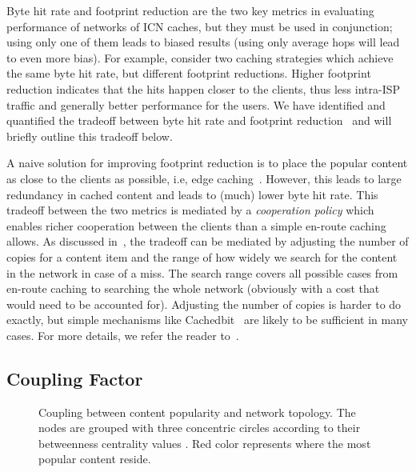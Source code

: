 \documentclass{sigcomm-alternate}
\begin{document}
Byte hit rate and footprint reduction are the two key metrics in evaluating performance of networks of ICN caches, but they must be used in conjunction; using only one of them leads to biased results (using only average hops will lead to even more bias).
For example, consider two caching strategies which achieve the same byte hit rate, but different footprint reductions.
Higher footprint reduction indicates that the hits happen closer to the clients, thus less intra-ISP traffic and generally better performance for the users.
We have identified and quantified the tradeoff between byte hit rate and footprint reduction~\cite{WangL:Cooperation} and will briefly outline this tradeoff below.

A naive solution for improving footprint reduction is to place the popular content as close to the clients as possible, i.e, edge caching~\cite{seyedicn2013}.
However, this leads to large redundancy in cached content and leads to (much) lower byte hit rate.
This tradeoff between the two metrics is mediated by a \emph{cooperation policy} which enables richer cooperation between the clients than a simple en-route caching allows.
As discussed in~\cite{WangL:Cooperation}, the tradeoff can be mediated by adjusting the number of copies for a content item and the range of how widely we search for the content in the network in case of a miss.
The search range covers all possible cases from en-route caching to searching the whole network (obviously with a cost that would need to be accounted for).
Adjusting the number of copies is harder to do exactly, but simple mechanisms like Cachedbit~\cite{wong:globecom2012} are likely to be sufficient in many cases.
For more details, we refer the reader to~\cite{WangL:Cooperation,wong:globecom2012}.















\subsection{Coupling Factor}
\label{sec:coupling-factor}

\begin{figure*}[!tb]
  \centering
  \quad
  \quad
  \caption{Coupling between content popularity and network topology. The nodes are grouped with three concentric circles according to their betweenness centrality values . Red color represents where the most popular content reside.}
  \label{fig:coupling}
\end{figure*}
\end{document}
